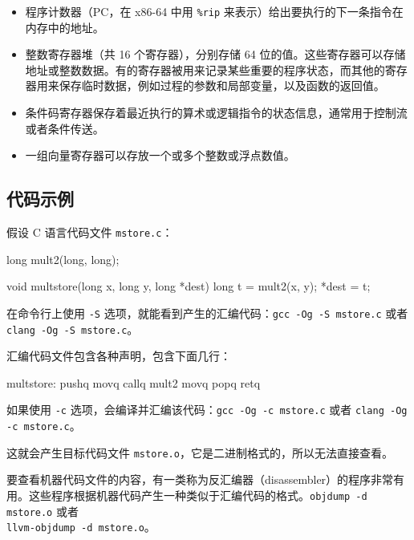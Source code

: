 \begin{itemize}
    \item 程序计数器（PC，在 x86-64 中用 \verb|%rip| 来表示）给出要执行的下一条指令在内存中的地址。
    \item 整数寄存器堆（共 16 个寄存器），分别存储 64 位的值。这些寄存器可以存储地址或整数数据。有的寄存器被用来记录某些重要的程序状态，而其他的寄存器用来保存临时数据，例如过程的参数和局部变量，以及函数的返回值。
    \item 条件码寄存器保存着最近执行的算术或逻辑指令的状态信息，通常用于控制流或者条件传送。
    \item 一组向量寄存器可以存放一个或多个整数或浮点数值。
\end{itemize}

\subsection{代码示例}

假设 C 语言代码文件 \verb|mstore.c|：

\begin{cppcode}
long mult2(long, long);

void multstore(long x, long y, long *dest) {
    long t = mult2(x, y);
    *dest = t;
}
\end{cppcode}

在命令行上使用 \verb|-S| 选项，就能看到产生的汇编代码：\verb|gcc -Og -S mstore.c| 或者 \verb|clang -Og -S mstore.c|。

汇编代码文件包含各种声明，包含下面几行：

\begin{gascode}
multstore:
    pushq   %
    movq    %
    callq   mult2
    movq    %
    popq    %
    retq
\end{gascode}

如果使用 \verb|-c| 选项，会编译并汇编该代码：\verb|gcc -Og -c mstore.c| 或者 \verb|clang -Og -c mstore.c|。

这就会产生目标代码文件 \verb|mstore.o|，它是二进制格式的，所以无法直接查看。


要查看机器代码文件的内容，有一类称为反汇编器（disassembler）的程序非常有用。这些程序根据机器代码产生一种类似于汇编代码的格式。\verb|objdump -d mstore.o| 或者\\ \verb|llvm-objdump -d mstore.o|。

